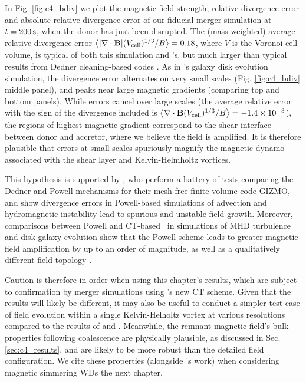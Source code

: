 In Fig. \ref{fig:c4_bdiv} we plot the magnetic field strength, relative divergence error and absolute relative divergence error of our fiducial merger simulation at $t = 200\,\mathrm{s}$, when the donor has just been disrupted.  The (mass-weighted) average relative divergence error $\left\langle|\mathbf{\nabla\cdot B}|(V_\mathrm{cell})^{1/3}/B\right\rangle = 0.18$, where $V$ is the Voronoi cell volume, is typical of both this simulation and \cite{pakms13}'s, but much larger than typical results from Dedner cleaning-based codes \citep{tric15, hopkr16}.  As in \cite{pakms13}'s galaxy disk evolution simulation, the divergence error alternates on very small scales (Fig. \ref{fig:c4_bdiv} middle panel), and peaks near large magnetic gradients (comparing top and bottom panels).  While errors cancel over large scales (the average relative error with the sign of the divergence included is $\left\langle\mathbf{\nabla\cdot B}(V_\mathrm{cell})^{1/3}/B\right\rangle = -1.4\times10^{-3}$), the regions of highest magnetic gradient correspond to the shear interface between donor and accretor, where we believe the field is amplified.  It is therefore plausible that errors at small scales spuriously magnify the magnetic dynamo associated with the shear layer and Kelvin-Helmholtz vortices.  

This hypothesis is supported by \cite{hopkr16}, who perform a battery of tests comparing the Dedner and Powell mechanisms for their mesh-free finite-volume code \textsc{GIZMO}, and show divergence errors in Powell-based simulations of advection and hydromagnetic instability lead to spurious and unstable field growth.  Moreover, comparisons between Powell and CT-based \arepo\ in simulations of MHD turbulence and disk galaxy evolution show that the Powell scheme leads to greater magnetic field amplification by up to an order of magnitude, as well as a qualitatively different field topology \citep{mocz+16}.



Caution is therefore in order when using this chapter's results, which are subject to confirmation by merger simulations using \arepo's new CT scheme.  Given that the results will likely be different, it may also be useful to conduct a simpler test case of field evolution within a single Kelvin-Helholtz vortex at various resolutions compared to the results of \cite{oberam10} and \cite{zrakm13}.  Meanwhile, the remnant magnetic field's bulk properties following coalescence are physically plausible, as discussed in Sec. \ref{sec:c4_results}, and are likely to be more robust than the detailed field configuration.  We cite these properties (alongside \cite{ji+13}'s work) when considering magnetic simmering WDs the next chapter.

